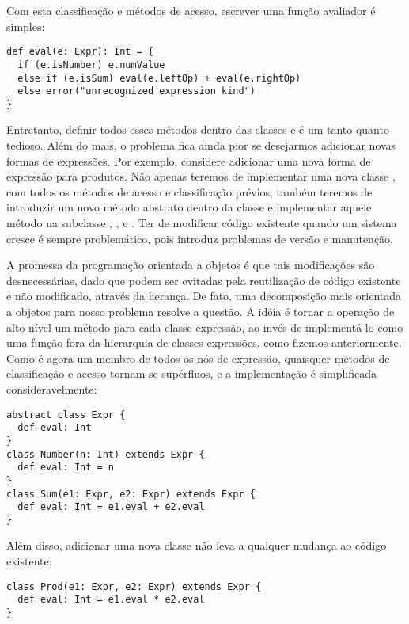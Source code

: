 Com esta classifica\c{c}\~{a}o e m\'{e}todos de acesso, escrever uma fun\c{c}\~{a}o avaliador \'{e} simples:
\begin{lstlisting}
def eval(e: Expr): Int = {
  if (e.isNumber) e.numValue
  else if (e.isSum) eval(e.leftOp) + eval(e.rightOp)
  else error("unrecognized expression kind")
}
\end{lstlisting}

Entretanto, definir todos esses m\'{e}todos dentro das classes  e 
\'{e} um tanto quanto tedioso. Al\'{e}m do mais, o problema fica ainda pior se desejarmos 
adicionar novas formas de express\~{o}es. Por exemplo, considere adicionar uma nova 
forma de express\~{a}o  para produtos. N\~{a}o apenas teremos de implementar uma nova classe 
, com todos os m\'{e}todos de acesso e classifica\c{c}\~{a}o pr\'{e}vios; tamb\'{e}m teremos de 
introduzir um novo m\'{e}todo abstrato  dentro da classe  e 
implementar aquele m\'{e}todo na subclasse , , e .
Ter de  modificar c\'{o}digo existente quando um sistema cresce \'{e} sempre problem\'{a}tico, pois
introduz problemas de vers\~{a}o e manuten\c{c}\~{a}o.  

A promessa da programa\c{c}\~{a}o orientada a objetos \'{e} que tais modifica\c{c}\~{o}es 
s\~{a}o desnecess\'{a}rias, dado que podem ser evitadas pela reutiliza\c{c}\~{a}o de c\'{o}digo 
existente e n\~{a}o modificado, atrav\'{e}s da heran\c{c}a. De fato, uma decomposi\c{c}\~{a}o 
mais orientada a objetos para nosso problema resolve a quest\~{a}o. A id\'{e}ia \'{e} tornar
a opera\c{c}\~{a}o de alto n\'{i}vel  um m\'{e}todo para cada classe express\~{a}o, ao 
inv\'{e}s de implement\'{a}-lo como uma fun\c{c}\~{a}o fora da hierarquia de classes express\~{o}es, como 
fizemos anteriormente. Como  \'{e} agora um membro de todos os n\'{o}s de express\~{a}o, 
quaisquer m\'{e}todos de classifica\c{c}\~{a}o e acesso tornam-se sup\'{e}rfluos, e a implementa\c{c}\~{a}o 
\'{e} simplificada consideravelmente:  
\begin{lstlisting}
abstract class Expr {
  def eval: Int
}
class Number(n: Int) extends Expr {
  def eval: Int = n
}
class Sum(e1: Expr, e2: Expr) extends Expr {
  def eval: Int = e1.eval + e2.eval
}
\end{lstlisting}

Al\'{e}m disso, adicionar uma nova classe  n\~{a}o leva a qualquer mudan\c{c}a ao c\'{o}digo existente:
\begin{lstlisting}
class Prod(e1: Expr, e2: Expr) extends Expr {
  def eval: Int = e1.eval * e2.eval
}
\end{lstlisting}


